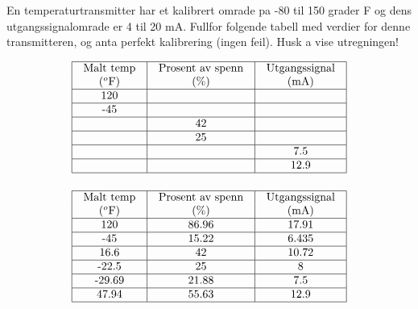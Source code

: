 

En temperaturtransmitter har et kalibrert omrade pa -80 til 150 grader F og dens utgangssignalomrade er 4 til 20 mA.  Fullfor folgende tabell med verdier for denne transmitteren, og anta perfekt kalibrering (ingen feil).  Husk a vise utregningen!


$$\vbox{\offinterlineskip
\halign{\strut
\vrule \quad\hfil # \ \hfil & 
\vrule \quad\hfil # \ \hfil & 
\vrule \quad\hfil # \ \hfil \vrule \cr
\noalign{\hrule}
%
Malt temp & Prosent av spenn & Utgangssignal \cr
%
($^{o}$F) & (\%) & (mA) \cr
%
\noalign{\hrule}
%
120 &  &  \cr
%
\noalign{\hrule}
%
-45 &  &  \cr
%
\noalign{\hrule}
%
 & 42 &  \cr
%
\noalign{\hrule}
%
 & 25 &  \cr
%
\noalign{\hrule}
%
 &  & 7.5 \cr
%
\noalign{\hrule}
%
 &  & 12.9 \cr
%
\noalign{\hrule}
} %
}$$ %








$$\vbox{\offinterlineskip
\halign{\strut
\vrule \quad\hfil # \ \hfil & 
\vrule \quad\hfil # \ \hfil & 
\vrule \quad\hfil # \ \hfil \vrule \cr
\noalign{\hrule}
%
Malt temp & Prosent av spenn & Utgangssignal \cr
%
($^{o}$F) & (\%) & (mA) \cr
%
\noalign{\hrule}
%
120 & 86.96 & 17.91 \cr
%
\noalign{\hrule}
%
-45 & 15.22 & 6.435 \cr
%
\noalign{\hrule}
%
16.6 & 42 & 10.72 \cr
%
\noalign{\hrule}
%
-22.5 & 25 & 8 \cr
%
\noalign{\hrule}
%
-29.69 & 21.88 & 7.5 \cr
%
\noalign{\hrule}
%
47.94 & 55.63 & 12.9 \cr
%
\noalign{\hrule}
} %
}$$ %











